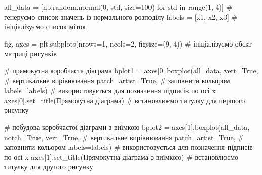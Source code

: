 \documentclass[
  letterpaper,
]{report}
\newenvironment{Shaded}{\begin{snugshade}}{\end{snugshade}}
\newcommand{\BuiltInTok}[1]{\textcolor[rgb]{0.00,0.23,0.31}{#1}}
\newcommand{\CommentTok}[1]{\textcolor[rgb]{0.37,0.37,0.37}{#1}}
\newcommand{\ControlFlowTok}[1]{\textcolor[rgb]{0.00,0.23,0.31}{#1}}
\newcommand{\DecValTok}[1]{\textcolor[rgb]{0.68,0.00,0.00}{#1}}
\newcommand{\KeywordTok}[1]{\textcolor[rgb]{0.00,0.23,0.31}{#1}}
\newcommand{\NormalTok}[1]{\textcolor[rgb]{0.00,0.23,0.31}{#1}}
\newcommand{\OperatorTok}[1]{\textcolor[rgb]{0.37,0.37,0.37}{#1}}
\newcommand{\StringTok}[1]{\textcolor[rgb]{0.13,0.47,0.30}{#1}}
\newcommand{\VariableTok}[1]{\textcolor[rgb]{0.07,0.07,0.07}{#1}}
\begin{document}
\begin{Shaded}
\begin{Highlighting}[]
\NormalTok{all\_data }\OperatorTok{=}\NormalTok{ [np.random.normal(}\DecValTok{0}\NormalTok{, std, size}\OperatorTok{=}\DecValTok{100}\NormalTok{) }\ControlFlowTok{for}\NormalTok{ std }\KeywordTok{in} \BuiltInTok{range}\NormalTok{(}\DecValTok{1}\NormalTok{, }\DecValTok{4}\NormalTok{)] }\CommentTok{\# генеруємо список значень із нормального розподілу}
\NormalTok{labels }\OperatorTok{=}\NormalTok{ [}\StringTok{\textquotesingle{}x1\textquotesingle{}}\NormalTok{, }\StringTok{\textquotesingle{}x2\textquotesingle{}}\NormalTok{, }\StringTok{\textquotesingle{}x3\textquotesingle{}}\NormalTok{] }\CommentTok{\# ініціалізуємо список міток}

\NormalTok{fig, axes }\OperatorTok{=}\NormalTok{ plt.subplots(nrows}\OperatorTok{=}\DecValTok{1}\NormalTok{, ncols}\OperatorTok{=}\DecValTok{2}\NormalTok{, figsize}\OperatorTok{=}\NormalTok{(}\DecValTok{9}\NormalTok{, }\DecValTok{4}\NormalTok{)) }\CommentTok{\# ініціалізуємо об\textquotesingle{}єкт матриці рисунків}

\CommentTok{\# прямокутна коробчаста діаграма}
\NormalTok{bplot1 }\OperatorTok{=}\NormalTok{ axes[}\DecValTok{0}\NormalTok{].boxplot(all\_data,}
\NormalTok{                         vert}\OperatorTok{=}\VariableTok{True}\NormalTok{,  }\CommentTok{\# вертикальне вирівнювання}
\NormalTok{                         patch\_artist}\OperatorTok{=}\VariableTok{True}\NormalTok{,  }\CommentTok{\# заповнити кольором}
\NormalTok{                         labels}\OperatorTok{=}\NormalTok{labels)  }\CommentTok{\# використовується для позначення підписів по осі x}
\NormalTok{axes[}\DecValTok{0}\NormalTok{].set\_title(}\StringTok{\textquotesingle{}Прямокутна діаграма\textquotesingle{}}\NormalTok{) }\CommentTok{\# встановлюємо титулку для першого рисунку}

\CommentTok{\# побудова коробчастої діаграми з виїмкою}
\NormalTok{bplot2 }\OperatorTok{=}\NormalTok{ axes[}\DecValTok{1}\NormalTok{].boxplot(all\_data,}
\NormalTok{                         notch}\OperatorTok{=}\VariableTok{True}\NormalTok{,}
\NormalTok{                         vert}\OperatorTok{=}\VariableTok{True}\NormalTok{,  }\CommentTok{\# вертикальне вирівнювання}
\NormalTok{                         patch\_artist}\OperatorTok{=}\VariableTok{True}\NormalTok{,  }\CommentTok{\# заповнити кольором}
\NormalTok{                         labels}\OperatorTok{=}\NormalTok{labels)  }\CommentTok{\# використовується для позначення підписів по осі x}
\NormalTok{axes[}\DecValTok{1}\NormalTok{].set\_title(}\StringTok{\textquotesingle{}Прямокутна діаграма з виїмкою\textquotesingle{}}\NormalTok{) }\CommentTok{\# встановлюємо титулку для другого рисунку}


\end{Highlighting}
\end{Shaded}
\end{document}
